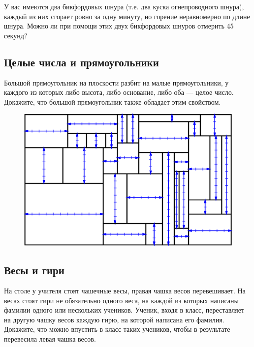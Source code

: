 У вас имеются два бикфордовых шнура (т.е. два куска огнепроводного шнура), каждый из них сгорает ровно за одну минуту, но горение неравномерно по длине шнура. Можно ли при помощи этих двух бикфордовых шнуров отмерить 45 секунд?






\subsection*{Целые числа и прямоугольники} %



Большой прямоугольник на плоскости разбит на малые прямоугольники, у каждого из которых  либо высота, либо основание, либо оба --- целое число.  
Докажите, что большой прямоугольник также обладает этим свойством.

\begin{figure}[h!]
\centering
\includegraphics[scale=0.6]{Figs/Insight/rect}
\end{figure}


\subsection*{Весы и гири}    %



На столе у учителя стоят чашечные весы, правая чашка весов перевешивает. На весах стоят гири не обязательно одного веса, на каждой из которых написаны фамилии одного или нескольких учеников. Ученик, входя в класс, переставляет на другую чашку весов каждую гирю, на которой написана его фамилия.
Докажите, что можно впустить в класс таких учеников, чтобы в результате перевесила левая чашка весов.




